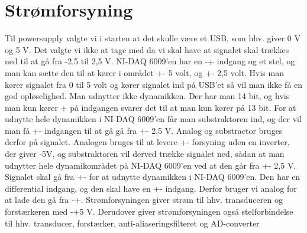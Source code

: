 \section{Strømforsyning}
Til powersupply valgte vi i starten at det skulle være et USB, som hhv. giver 0 V og 5 V. Det valgte vi ikke at tage med da vi skal have at signalet skal trækkes ned til at gå fra -2,5 til 2,5 V. NI-DAQ 6009'en har en -+ indgang og et stel, og man kan sætte den til at kører i området +- 5 volt, og +- 2,5 volt. Hvis man kører signalet fra 0 til 5 volt og kører signalet ind på USB’et så vil man ikke få en god opløselighed. Man udnytter ikke dynamikken. Der har man 14 bit, og hvis man kun kører + på indgangen svarer det til at man kun kører på 13 bit. For at udnytte hele dynamikken i NI-DAQ 6009’en får man substraktoren ind, og der vil man få +- indgangen til at gå gå fra +- 2,5 V. Analog og substractor bruges derfor på signalet. Analogen bruges til at levere +- forsyning uden en inverter, der giver -5V, og substraktoren vil derved trække signalet ned, sådan at  man udnytter hele dynamikområdet på NI-DAQ 6009’en ved at den  går fra +- 2,5 V. Signalet skal gå fra +- for at udnytte dynamikken i NI-DAQ 6009’en. Den har en differential indgang, og den skal have en +- indgang. Derfor bruger vi analog for at lade den gå fra -+.
Strømforsyningen giver strøm til hhv. transduceren og forstærkeren med -+5 V.  Derudover giver strømforsyningen også stelforbindelse til hhv. transducer, forstærker, anti-aliaseringsfilteret og AD-converter